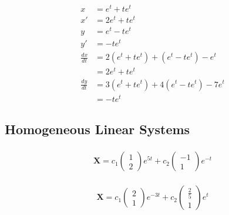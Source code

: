 \documentclass{article}
\begin{document}
\setcounter{subsubsection}{22}
\subsubsection{}

\begin{align*}
  x               & = e^t + t e^t                               \\
  x'              & = 2 e^t + t e^t                             \\
  y               & = e^t - t e^t                               \\
  y'              & = - t e^t                                   \\
  \frac{d x}{d t} & = 2 (e^t + t e^t) + (e^t - t e^t) - e^t     \\
                  & = 2 e^t + t e^t                             \\
  \frac{d y}{d t} & = 3 (e^t + t e^t) + 4 (e^t - t e^t) - 7 e^t \\
                  & = -t e^t
\end{align*}

\subsection{Homogeneous Linear Systems}

\subsubsection{}

\[\mathbf{X} = c_1 \begin{pmatrix}
    1 \\
    2
  \end{pmatrix} e^{5 t} + c_2 \begin{pmatrix}
    -1 \\
    1
  \end{pmatrix} e^{-t}\]

\setcounter{subsubsection}{2}
\subsubsection{}

\[\mathbf{X} = c_1 \begin{pmatrix}
    2 \\
    1
  \end{pmatrix} e^{-3 t} + c_2 \begin{pmatrix}
    \frac{2}{5} \\
    1
  \end{pmatrix} e^{t}\]
\end{document}
